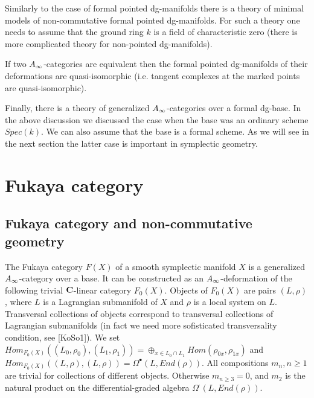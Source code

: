 \documentclass[a4paper,12pt]{article}
\begin{document}
 Similarly to the case of formal pointed dg-manifolds
there is a theory of minimal models of non-commutative formal 
pointed dg-manifolds. For such a theory one needs to assume that the ground ring $k$ is a field
of characteristic zero (there is more complicated  theory for non-pointed
dg-manifolds).

 If two $A_{\infty}$-categories are equivalent then the
formal pointed dg-manifolds of their deformations are quasi-isomorphic
(i.e. tangent complexes at the marked points are quasi-isomorphic).

Finally, there is a theory of generalized $A_{\infty}$-categories
over a formal dg-base. In the above discussion we discussed
 the case when the base was an ordinary scheme $Spec(k)$. We can also assume that
the base is a formal scheme.  As we will see in the next section the latter case is important
in symplectic geometry.


\section{Fukaya category}


\subsection{Fukaya category and non-commutative geometry}

The Fukaya category $F(X)$ of a smooth symplectic manifold $X$
is a generalized $A_{\infty}$-category over a base. It can be constructed
as an $A_{\infty}$-deformation of the following trivial ${\bf C}$-linear category $F_0(X)$.
Objects of $F_0(X)$ are pairs $(L,\rho)$, where $L$ is a Lagrangian
submanifold of $X$ and $\rho$ is a local system on $L$.
Transversal collections of objects correspond to transversal
collections of Lagrangian submanifolds (in fact we need more sofisticated
transversality condition, see [KoSo1]).
We set 
$Hom_{F_0(X)}((L_0,\rho_0),(L_1,\rho_1))=\oplus_{x\in L_0\cap L_1}
Hom(\rho_{0x},\rho_{1x})$ and
$Hom_{F_0(X)}((L,\rho),(L,\rho))=\Omega^{\bullet}(L,End(\rho))$.
All compositions $m_n, n\ge 1$ are trivial for collections
of different objects. Otherwise $m_{n\ge 3}=0$, and $m_2$  is the natural product
on the differential-graded algebra  $\Omega^{\cdot}(L,End(\rho))$.
\end{document}
